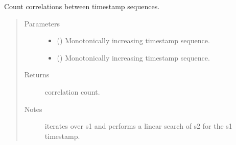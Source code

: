 \documentclass[letterpaper,10pt,english]{sphinxmanual}
\begin{document}
\begin{fulllineitems}
\label{\detokenize{tes:tes.analysis.xcor}}
\sphinxAtStartPar
Count correlations between timestamp sequences.
\begin{quote}\begin{description}
\item[{Parameters}] \leavevmode\begin{itemize}
\item {} 
\sphinxAtStartPar
{} () \textendash{} Monotonically increasing timestamp sequence.

\item {} 
\sphinxAtStartPar
{} () \textendash{} Monotonically increasing timestamp sequence.

\end{itemize}

\item[{Returns}] \leavevmode
\sphinxAtStartPar
correlation count.

\item[{Notes}] \leavevmode
\sphinxAtStartPar
iterates over s1 and performs a linear search of  s2 for the s1
timestamp.

\end{description}\end{quote}

\end{fulllineitems}
\end{document}
